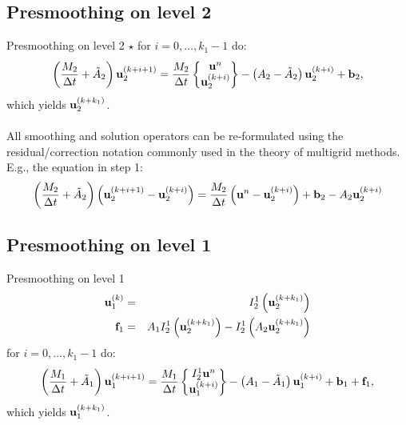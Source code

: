 \documentclass[mathserif]{beamer}
\begin{document}
\subsection{Presmoothing on level 2}
\begin{frame}
{\Large Presmoothing on level 2 $\star$}
for $i = 0, \dots , k_1-1$ do:
\[
\left(\frac{M_2}{\Delta t} + \tilde{A}_2\right) \mathbf{u}_2^{(k+i+1)} 
= \frac{M_2}{\Delta t} \begin{Bmatrix} \mathbf{u}^n\\ \mathbf{u}_2^{(k+i)} \end{Bmatrix} 
- \left(A_2-\tilde{A}_2\right) \mathbf{u}_2^{(k+i)} + \mathbf{b}_2,
\]
which yields $\mathbf{u}_{2}^{(k+k_1)}$.\ \\\ \\
All smoothing and 
solution operators can be re-formulated using 
the residual/correction notation commonly used in the theory of multigrid
methods. E.g., the equation in step 1:
$$\left(\frac{M_2}{\Delta t} + \tilde{A}_2\right) 
\left(\mathbf{u}_2^{(k+i+1)} - \mathbf{u}_2^{(k+i)}\right) 
= \frac{M_2}{\Delta t}\left( \mathbf{u}^n-\mathbf{u}_2^{(k+i)}\right) + \mathbf{b}_2 - A_2\mathbf{u}_2^{(k+i)}$$

\end{frame}


\subsection{Presmoothing on level 1}
\begin{frame}
{\Large Presmoothing on level 1}
\begin{eqnarray*}
\mathbf{u}_1^{(k)} & = & I_2^1\left(\mathbf{u}_2^{(k+k_1)}\right)\\
\mathbf{f}_1 & = & A_1 I_2^1\left(\mathbf{u}_2^{(k+k_1)}\right) - I_2^1 \left(A_2 \mathbf{u}_2^{(k+k_1)} \right)
\end{eqnarray*}
for $i = 0, \dots, k_1-1$ do:
\[
\left(\frac{M_1}{\Delta t} + \tilde{A}_1\right) \mathbf{u}_1^{(k+i+1)}
= \frac{M_1}{\Delta t} \begin{Bmatrix} I_2^1 \mathbf{u}^n\\\mathbf{u}_1^{(k+i)} \end{Bmatrix} 
- \left(A_1-\tilde{A}_1\right) \mathbf{u}_1^{(k+i)} + \mathbf{b}_1 + \mathbf{f}_1,
\]
which yields $\mathbf{u}_1^{(k+k_1)}$.

\end{frame}
\end{document}

